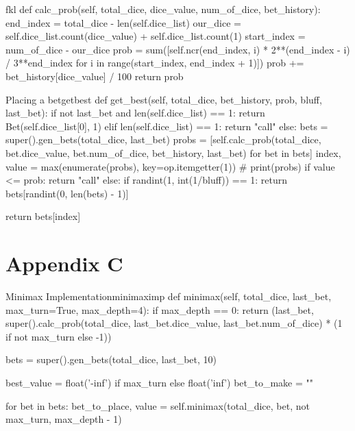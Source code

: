 \begin{appendices}
    \begin{myminted}{}{fkl}
        def calc_prob(self, total_dice, dice_value, num_of_dice, bet_history):
            end_index = total_dice - len(self.dice_list)
            our_dice = self.dice_list.count(dice_value) + self.dice_list.count(1)
            start_index = num_of_dice - our_dice
            prob = sum([self.ncr(end_index, i) * 2**(end_index - i) / 3**end_index
                        for i in range(start_index, end_index + 1)])
            prob += bet_history[dice_value] / 100
            return prob
    \end{myminted}

    \begin{myminted}{Placing a bet}{getbest}
        def get_best(self, total_dice, bet_history, prob, bluff, last_bet):
            if not last_bet and len(self.dice_list) == 1:
                return Bet(self.dice_list[0], 1)
            elif len(self.dice_list) == 1:
                return "call"
            else:
                bets = super().gen_bets(total_dice, last_bet)
                probs = [self.calc_prob(total_dice, bet.dice_value, bet.num_of_dice, bet_history, last_bet) for bet in bets]
                index, value = max(enumerate(probs), key=op.itemgetter(1))
                # print(probs)
                if value <= prob:
                    return "call"
                else:
                    if randint(1, int(1/bluff)) == 1:
                        return bets[randint(0, len(bets) - 1)]

                    return bets[index]
    \end{myminted}

    \chapter{Appendix C}

    \begin{myminted}{Minimax Implementation}{minimaximp}
        def minimax(self, total_dice, last_bet, max_turn=True, max_depth=4):
            if max_depth == 0:
                return (last_bet, super().calc_prob(total_dice, last_bet.dice_value, last_bet.num_of_dice) * (1 if not max_turn else -1))

            bets = super().gen_bets(total_dice, last_bet, 10)

            best_value = float('-inf') if max_turn else float('inf')
            bet_to_make = ""

            for bet in bets:
                bet_to_place, value = self.minimax(total_dice, bet, not max_turn, max_depth - 1)


\end{myminted}
\end{appendices}

